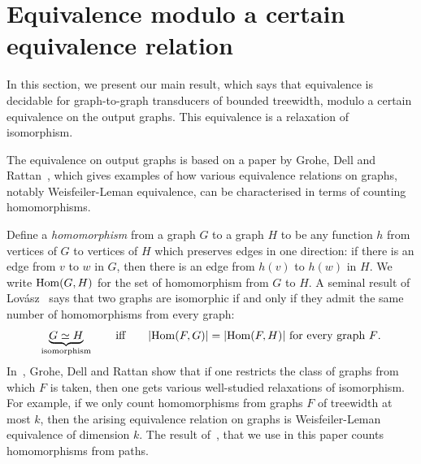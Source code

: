 
\section{Equivalence  modulo a certain equivalence relation}\label{sec:equivalence-modulo}
In this section, we present our main result, which says  that equivalence is decidable for graph-to-graph transducers of bounded treewidth, modulo a certain equivalence on the output graphs. This equivalence is a relaxation of isomorphism.  

 The equivalence on output graphs is based on a paper by Grohe, Dell and Rattan~\cite{groheDellRattan2018}, which gives examples of how various equivalence relations on graphs, notably Weisfeiler-Leman equivalence, can be characterised in terms of counting homomorphisms. 

Define a \emph{homomorphism} from a graph $G$ to a graph $H$ to be any function $h$ from vertices of $G$ to vertices of $H$ which preserves edges in one direction: if there is an edge from $v$ to $w$ in $G$, then there is an edge from $h(v)$ to $h(w)$ in $H$. We write $\mathrm {Hom}(G,H)$ for the set of homomorphism from $G$ to $H$. A seminal result of  Lov\'asz~\cite[p.~326]{lovasz1967operations} says that two graphs are isomorphic if and only if they admit the same number of homomorphisms from every graph:
\begin{align*}
\underbrace{G \simeq H}_{\text{isomorphism}} \qquad \text{iff} \qquad  |\mathrm {Hom}(F,G)|=|\mathrm {Hom}(F,H)| \ \text{for every graph $F$.}
\end{align*}
In~\cite{groheDellRattan2018},
Grohe, Dell and Rattan show that if one restricts the  class of graphs from which $F$ is taken, then one gets various well-studied relaxations of isomorphism. For example, if we only count homomorphisms from graphs $F$ of treewidth at most $k$, then the arising equivalence relation on graphs is Weisfeiler-Leman equivalence of dimension $k$.  The result of~\cite{groheDellRattan2018},  that we use in this paper counts homomorphisms from paths.

